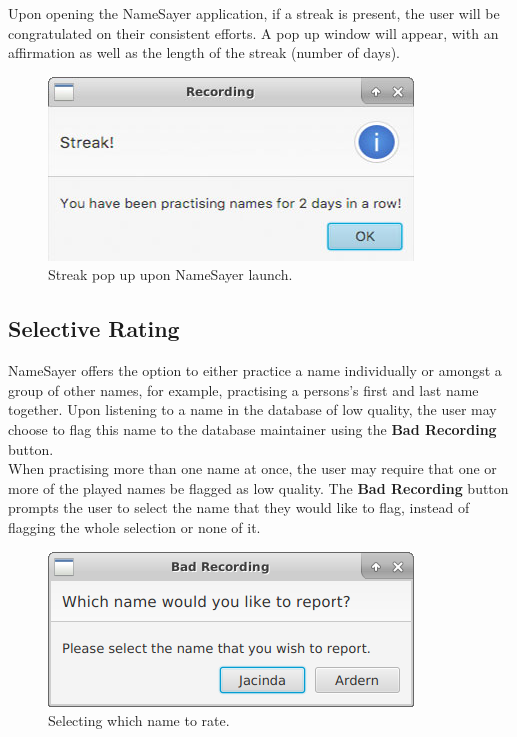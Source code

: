 \documentclass{article}
\begin{document}
Upon opening the NameSayer application, if a streak is present, the user will be
congratulated on their consistent efforts. A pop up window will appear, with an
affirmation as well as the length of the streak (number of days).

\begin{figure}[H]
	\centerline{\includegraphics[width=\textwidth/2]{images/15_streak.jpg}}
	\caption{Streak pop up upon NameSayer launch.}
	\label{streak}
\end{figure}

\subsection{Selective Rating}
NameSayer offers the option to either practice a name individually or amongst a
group of other names, for example, practising a persons's first and last name
together. Upon listening to a name in the database of low quality, the user may
choose to flag this name to the database maintainer using the \textbf{Bad
Recording} button. \\

When practising more than one name at once, the user may require that one or
more of the played names be flagged as low quality. The \textbf{Bad Recording}
button prompts the user to select the name that they would like to flag, instead
of flagging the whole selection or none of it.

\begin{figure}[H]
	\centerline{\includegraphics[width=\textwidth/2]{images/11_bad_recording.png}}
	\caption{Selecting which name to rate.}
	\label{badrecording}
\end{figure}
\end{document}
